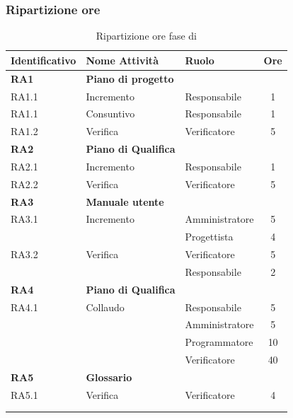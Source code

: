 \subsubsection{Ripartizione ore}
\bgroup
\begin{longtable}{|l|l|l|c|}
	\endfirsthead
	\hline
	\textbf{Identificativo} &
	\textbf{Nome Attività} &
	\textbf{Ruolo} &
	\textbf{Ore}\\
	\endhead
	\hline
	\textbf{RA1} & \textbf{Piano di progetto} &  &  \\
	\hline
	{RA1.1} & {Incremento} & Responsabile  & 1\\
	\hline
	{RA1.1} & {Consuntivo} & Responsabile  & 1\\
	\hline
	{RA1.2} & {Verifica} & Verificatore & 5 \\
	\hline
	\textbf{RA2} & \textbf{Piano di Qualifica}  & & \\
	\hline
	{RA2.1} & {Incremento} & Responsabile &  1\\
	\hline
	{RA2.2} & {Verifica} & Verificatore & 5 \\
	\hline
	\textbf{RA3} & \textbf{Manuale utente} & &  \\
	\hline
	{RA3.1} & {Incremento} & Amministratore  &  5\\
	& & Progettista & 4 \\
	\hline
	{RA3.2} & {Verifica} & Verificatore  &  5\\
	& & Responsabile & 2 \\
	\hline
	\textbf{RA4} & \textbf{Piano di Qualifica}  & & \\
	\hline
	{RA4.1} & {Collaudo} & Responsabile &  5\\
	& & Amministratore & 5 \\
	& & Programmatore & 10 \\
	& & Verificatore & 40 \\
	\hline
	\textbf{RA5} & \textbf{Glossario} & &  \\
	\hline
	{RA5.1} & {Verifica} & Verificatore &  4 \\
	\hline
	\\
	\caption{Ripartizione ore fase di \VV}
\end{longtable}
\egroup
